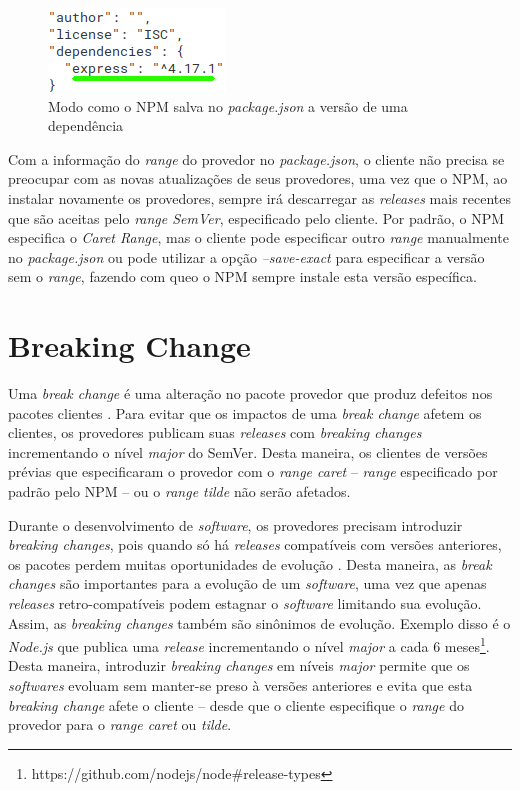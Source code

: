 \begin{figure}
    \centering
    \includegraphics{figuras/dependencies_express.png}
    \caption{Modo como o \gls{NPM} salva no \textit{package.json} a versão de uma dependência}
    \label{fig:dep_express}
\end{figure}{}

Com a informação do \textit{range} do provedor no \textit{package.json}, o cliente não precisa se preocupar com as novas atualizações de seus provedores, uma vez que o \gls{NPM}, ao instalar novamente os provedores, sempre irá descarregar as \textit{releases} mais recentes que são aceitas pelo \textit{range SemVer}, especificado pelo cliente. Por padrão, o \gls{NPM} especifica o \textit{Caret Range}, mas o cliente pode especificar outro \textit{range} manualmente no \textit{package.json} ou pode utilizar a opção \textit{--save-exact} para especificar a versão sem o \textit{range}, fazendo com queo o \gls{NPM} sempre instale esta versão específica.

\section{Breaking Change}
\label{ref-teo:breaking_change}
Uma \textit{break change} é uma alteração no pacote provedor que produz defeitos nos pacotes clientes \cite{teorical_reference:semver}. Para evitar que os impactos de uma \textit{break change} afetem os clientes, os provedores publicam suas \textit{releases} com \textit{breaking changes} incrementando o nível \textit{major} do \gls{SemVer}. Desta maneira, os clientes de versões prévias que especificaram o provedor com o \textit{range caret} -- \textit{range} especificado por padrão pelo \gls{NPM} -- ou o \textit{range tilde} não serão afetados.

Durante o desenvolvimento de \textit{software}, os provedores precisam introduzir \textit{breaking changes}, pois quando só há \textit{releases} compatíveis com versões anteriores, os pacotes perdem muitas oportunidades de evolução \cite{teorical_reference:bc_2}. Desta maneira, as \textit{break changes} são importantes para a evolução de um \textit{software}, uma vez que apenas \textit{releases} retro-compatíveis podem estagnar o \textit{software} limitando sua evolução. Assim, as \textit{breaking changes} também são sinônimos de evolução. Exemplo disso é o \textit{Node.js} que publica uma \textit{release} incrementando o nível \textit{major} a cada 6 meses\footnote{https://github.com/nodejs/node\#release-types}. Desta maneira, introduzir \textit{breaking changes} em níveis \textit{major} permite que os \textit{softwares} evoluam sem manter-se preso à versões anteriores e evita que esta \textit{breaking change} afete o cliente -- desde que o cliente especifique o \textit{range} do provedor  para o \textit{range caret} ou \textit{tilde}.

